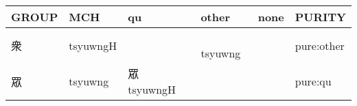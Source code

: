\documentclass[14pt,a4paper]{scrartcl}
\begin{document}
\begin{longtable}[c]{@{}llllll@{}}
\toprule
\begin{minipage}[b]{0.14\columnwidth}\raggedright\strut
GROUP
\strut\end{minipage} &
\begin{minipage}[b]{0.14\columnwidth}\raggedright\strut
MCH
\strut\end{minipage} &
\begin{minipage}[b]{0.14\columnwidth}\raggedright\strut
qu
\strut\end{minipage} &
\begin{minipage}[b]{0.14\columnwidth}\raggedright\strut
other
\strut\end{minipage} &
\begin{minipage}[b]{0.14\columnwidth}\raggedright\strut
none
\strut\end{minipage} &
\begin{minipage}[b]{0.14\columnwidth}\raggedright\strut
PURITY
\strut\end{minipage}\tabularnewline
\midrule
\endhead
\begin{minipage}[t]{0.14\columnwidth}\raggedright\strut
衆
\strut\end{minipage} &
\begin{minipage}[t]{0.14\columnwidth}\raggedright\strut
tsyuwngH
\strut\end{minipage} &
\begin{minipage}[t]{0.14\columnwidth}\raggedright\strut
\strut\end{minipage} &
\begin{minipage}[t]{0.14\columnwidth}\raggedright\strut
𧑄 tsyuwng
\strut\end{minipage} &
\begin{minipage}[t]{0.14\columnwidth}\raggedright\strut
\strut\end{minipage} &
\begin{minipage}[t]{0.14\columnwidth}\raggedright\strut
pure:other
\strut\end{minipage}\tabularnewline
\begin{minipage}[t]{0.14\columnwidth}\raggedright\strut
眾
\strut\end{minipage} &
\begin{minipage}[t]{0.14\columnwidth}\raggedright\strut
tsyuwng
\strut\end{minipage} &
\begin{minipage}[t]{0.14\columnwidth}\raggedright\strut
眾 tsyuwngH
\strut\end{minipage} &
\begin{minipage}[t]{0.14\columnwidth}\raggedright\strut
\strut\end{minipage} &
\begin{minipage}[t]{0.14\columnwidth}\raggedright\strut
\strut\end{minipage} &
\begin{minipage}[t]{0.14\columnwidth}\raggedright\strut
pure:qu
\strut\end{minipage}\tabularnewline
\bottomrule
\end{longtable}
\end{document}
